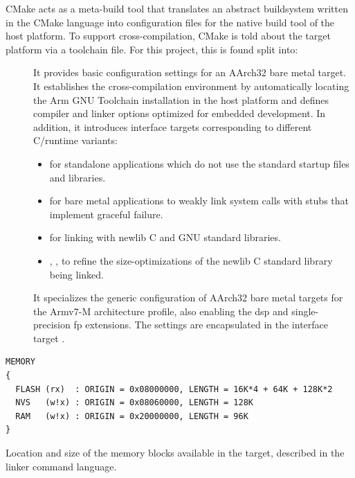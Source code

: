 CMake acts as a meta-build tool that translates an abstract buildsystem written in the CMake language into configuration files for the native build tool of the host platform.
To support cross-compilation, CMake is told about the target platform via a toolchain file. For this project, this is found split into:
\begin{description}
    \item[] It provides basic configuration settings for an AArch32 bare metal target. It establishes the cross-compilation environment by automatically locating the Arm GNU Toolchain installation in the host platform and defines compiler and linker options optimized for embedded development.
    In addition, it introduces interface targets corresponding to different C/\cpp runtime variants: 
    \begin{itemize}
        \item {} for standalone applications which do not use the standard startup files and libraries.
        \item {} for bare metal applications to weakly link system calls with stubs that implement graceful failure.
        \item {} for linking with newlib C and GNU \cpp standard libraries.
        \item {}, ,  to refine the size-optimizations of the newlib C standard library being linked.
    \end{itemize}

    \item[] It specializes the generic configuration of AArch32 bare metal targets for the Armv7-M architecture profile, also enabling the \ac{dsp} and single-precision \ac{fp} extensions. The settings are encapsulated in the interface target .
\end{description}

\begin{listing}
\begin{verbatim}
MEMORY
{
  FLASH (rx)  : ORIGIN = 0x08000000, LENGTH = 16K*4 + 64K + 128K*2
  NVS   (w!x) : ORIGIN = 0x08060000, LENGTH = 128K
  RAM   (w!x) : ORIGIN = 0x20000000, LENGTH = 96K
}
\end{verbatim}
\caption{Location and size of the memory blocks available in the \mcu target, described in the linker command language.}
\label{lst:ld_script}
\end{listing}
    
